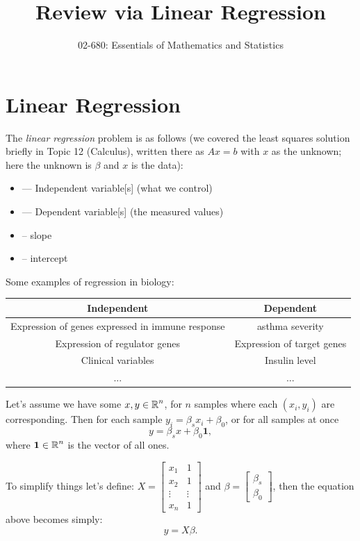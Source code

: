

\title{Review via Linear Regression}
\author{02-680: Essentials of Mathematics and Statistics}


\maketitle

\section{Linear Regression}
The \emph{linear regression} problem is as follows 
(we covered the least squares solution briefly in Topic 12 (Calculus), written there as $Ax=b$ with $x$ as the unknown; here the unknown is $\beta$ and $x$ is the data):
\begin{itemize}
\item[\textbf{$x$}] --- Independent variable[s] (what we control)
\item[\textbf{$y$}] --- Dependent variable[s] (the measured values)
\item[\textbf{$\beta_s$}] -- slope
\item[\textbf{$\beta_0$}] -- intercept
\end{itemize} 


Some examples of regression in biology:
\begin{center}\begin{tabular}{|c|c|}
\hline
Independent & Dependent\\
\hline\hline
Expression of genes expressed in immune response & asthma severity\\
\hline
Expression of regulator genes & Expression of target genes\\
\hline
Clinical variables & Insulin level\\
\hline
... & ...
\end{tabular}\end{center}

Let's assume we have some $x,y\in\operatorname{\mathbb{R}}^n$, for $n$ samples where each $(x_i,y_i)$ are corresponding. 
Then for each sample $y_i = \beta_s x_i + \beta_0$, or for all samples at once \[y = \beta_s x + \beta_0\mathbf{1},\]
where $\mathbf{1}\in\operatorname{\mathbb{R}}^n$ is the vector of all ones.

To simplify things let's define:
$X = \begin{bmatrix} x_1 & 1\\x_2 & 1\\\vdots & \vdots\\x_n & 1\end{bmatrix}$ and $\beta = \begin{bmatrix}\beta_s\\\beta_0\end{bmatrix}$, 
then the equation above becomes simply:
\[y = X\beta.\]


